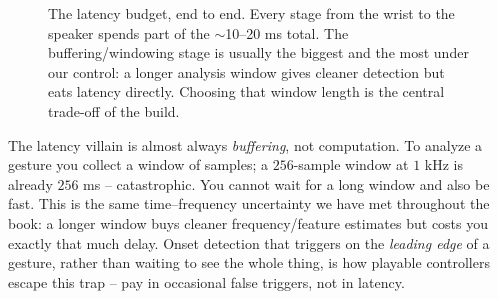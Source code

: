 \begin{figure}[H]
\centering
{}
\caption{The latency budget, end to end. Every stage from the wrist to the speaker spends part of the
$\sim$10--20 ms total. The buffering/windowing stage is usually the biggest and the most under our
control: a longer analysis window gives cleaner detection but eats latency directly. Choosing that
window length is the central trade-off of the build.}
\label{ch29:fig-latency}
\end{figure}

\begin{trapbox}
The latency villain is almost always \emph{buffering}, not computation. To analyze a gesture you
collect a window of samples; a $256$-sample window at $1$ kHz is already $256$ ms -- catastrophic. You
cannot wait for a long window and also be fast. This is the same time--frequency uncertainty we have
met throughout the book: a longer window buys cleaner frequency/feature estimates but costs you
exactly that much delay. Onset detection that triggers on the \emph{leading edge} of a gesture,
rather than waiting to see the whole thing, is how playable controllers escape this trap -- pay in
occasional false triggers, not in latency.
\end{trapbox}

